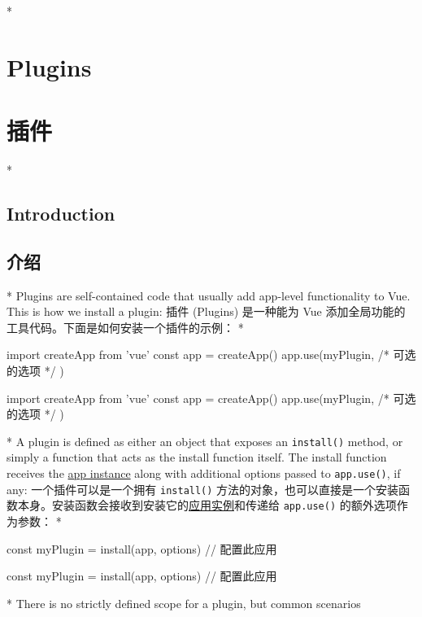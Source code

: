 \begin{paracol}{2}
 
\switchcolumn[0]*%
\section{Plugins}
\switchcolumn
\section{插件}
\switchcolumn[0]*%
\subsection{Introduction}
\switchcolumn
\subsection{介绍}
\switchcolumn[0]*%
Plugins are self-contained code that usually add app-level functionality
to Vue. This is how we install a plugin:
\switchcolumn
插件 (Plugins) 是一种能为 Vue
添加全局功能的工具代码。下面是如何安装一个插件的示例：
\switchcolumn[0]*%
\begin{codeJs}
import { createApp } from 'vue'
const app = createApp({})
app.use(myPlugin, {
  /* 可选的选项 */
})
\end{codeJs}
\switchcolumn
\begin{codeJs}
import { createApp } from 'vue'
const app = createApp({})
app.use(myPlugin, {
  /* 可选的选项 */
})
\end{codeJs}
\switchcolumn[0]*%
A plugin is defined as either an object that exposes an
\texttt{install()} method, or simply a function that acts as the install
function itself. The install function receives the
\href{https://vuejs.org/api/application.html}{app instance} along with
additional options passed to \texttt{app.use()}, if any:
\switchcolumn
一个插件可以是一个拥有 \texttt{install()}
方法的对象，也可以直接是一个安装函数本身。安装函数会接收到安装它的\href{https://cn.vuejs.org/api/application.html}{应用实例}和传递给
\texttt{app.use()} 的额外选项作为参数：
\switchcolumn[0]*%
\begin{codeJs}
const myPlugin = {
  install(app, options) {
    // 配置此应用
  }
}
\end{codeJs}
\switchcolumn
\begin{codeJs}
const myPlugin = {
  install(app, options) {
    // 配置此应用
  }
}
\end{codeJs}
\switchcolumn[0]*%
There is no strictly defined scope for a plugin, but common scenarios

\end{paracol}
